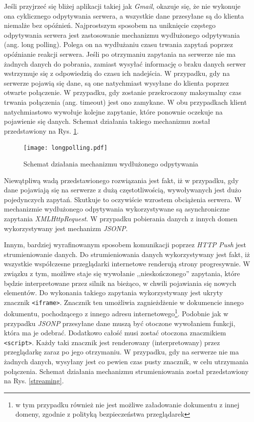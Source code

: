 \documentclass[a4paper,12pt]{article}
\providecommand{\imref}[1]{Rys. \ref{#1}} %
\begin{document}
Jeśli przyjrzeć się bliżej aplikacji takiej jak \emph{Gmail}, okazuje
się, że nie wykonuje ona cyklicznego odpytywania serwera, a wszystkie
dane przesyłane są do klienta niemalże bez opóźnień. Najprostszym
sposobem na uniknięcie częstego odpytywania serwera jest zastosowanie
mechanizmu wydłużonego odpytywania (ang. long polling). Polega on na
wydłużaniu czasu trwania zapytań poprzez opóźnianie reakcji
serwera. Jeśli po otrzymaniu zapytania na serwerze nie ma żadnych
danych do pobrania, zamiast wysyłać informację o braku danych serwer
wstrzymuje się z odpowiedzią do czasu ich nadejścia. W przypadku, gdy
na serwerze pojawią się dane, są one natychmiast wysyłane do klienta
poprzez otwarte połączenie. W przypadku, gdy zostanie przekroczony
maksymalny czas trwania połączenia (ang. timeout) jest ono zamykane. W
obu przypadkach klient natychmiastowo wywołuje kolejne zapytanie,
które ponownie oczekuje na pojawienie się danych. Schemat działania
takiego mechanizmu został przedstawiony na \imref{longpolling}.

\begin{figure}[ht]
  \begin{center}
    \texttt{[image: longpolling.pdf]}
  \end{center}
  \caption{Schemat działania mechanizmu wydłużonego odpytywania}
  \label{longpolling}
\end{figure}

Niewątpliwą wadą przedstawionego rozwiązania jest fakt, iż w
przypadku, gdy dane pojawiają się na serwerze z dużą częstotliwością,
wywoływanych jest dużo pojedynczych zapytań. Skutkuje to oczywiście
wzrostem obciążenia serwera. W mechanizmie wydłużonego odpytywania
wykorzystywane są asynchroniczne zapytania \emph{XMLHttpRequest}. W
przypadku pobierania danych z innych domen wykorzystywany jest
mechanizm \emph{JSONP}.

Innym, bardziej wyrafinowanym sposobem komunikacji poprzez \emph{HTTP
  Push} jest strumieniowanie danych. Do strumieniowania danych
wykorzystywany jest fakt, iż wszystkie współczesne przeglądarki
internetowe renderują strony progresywnie. W związku z tym, możliwe
staje się wywołanie ,,nieskończonego'' zapytania, które będzie
interpretowane przez silnik na bieżąco, w chwili pojawiania się nowych
elementów. Do wykonania takiego zapytania wykorzystywany jest ukryty
znacznik \texttt{<iframe>}. Znacznik ten umożliwia zagnieżdżenie w
dokumencie innego dokumentu, pochodzącego z innego adresu
internetowego\footnote{w tym przypadku również nie jest możliwe
  załadowanie dokumentu z innej domeny, zgodnie z polityką
  bezpieczeństwa przeglądarek}. Podobnie jak w przypadku \emph{JSONP}
przesyłane dane muszą być otoczone wywołaniem funkcji, która ma je
odebrać. Dodatkowo całość musi zostać otoczona znacznikiem
\texttt{<script>}. Każdy taki znacznik jest renderowany
(interpretowany) przez przeglądarkę zaraz po jego otrzymaniu. W
przypadku, gdy na serwerze nie ma żadnych danych, wysyłany jest co
pewien czas pusty znacznik, w celu utrzymania połączenia. Schemat
działania mechanizmu strumieniowania został przedstawiony na
\imref{streaming}.
\end{document}
